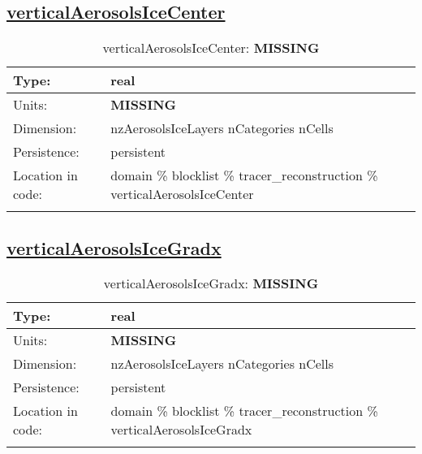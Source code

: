 \subsection[verticalAerosolsIceCenter]{\hyperref[sec:var_tab_tracer_reconstruction]{verticalAerosolsIceCenter}}
\label{subsec:var_sec_tracer_reconstruction_verticalAerosolsIceCenter}
\begin{center}
\begin{longtable}{| p{2.0in} | p{4.0in} |}
        \hline 
        Type: & real \\
        \hline 
        Units: & {\bf \color{red} MISSING} \\
        \hline 
        Dimension: & nzAerosolsIceLayers nCategories nCells \\
        \hline 
        Persistence: & persistent \\
        \hline 
         Location in code: & domain \% blocklist \% tracer\_reconstruction \% verticalAerosolsIceCenter \\
         \hline 
    \caption{verticalAerosolsIceCenter: {\bf \color{red} MISSING}}
\end{longtable}
\end{center}
\subsection[verticalAerosolsIceGradx]{\hyperref[sec:var_tab_tracer_reconstruction]{verticalAerosolsIceGradx}}
\label{subsec:var_sec_tracer_reconstruction_verticalAerosolsIceGradx}
\begin{center}
\begin{longtable}{| p{2.0in} | p{4.0in} |}
        \hline 
        Type: & real \\
        \hline 
        Units: & {\bf \color{red} MISSING} \\
        \hline 
        Dimension: & nzAerosolsIceLayers nCategories nCells \\
        \hline 
        Persistence: & persistent \\
        \hline 
         Location in code: & domain \% blocklist \% tracer\_reconstruction \% verticalAerosolsIceGradx \\
         \hline 
    \caption{verticalAerosolsIceGradx: {\bf \color{red} MISSING}}
\end{longtable}
\end{center}
